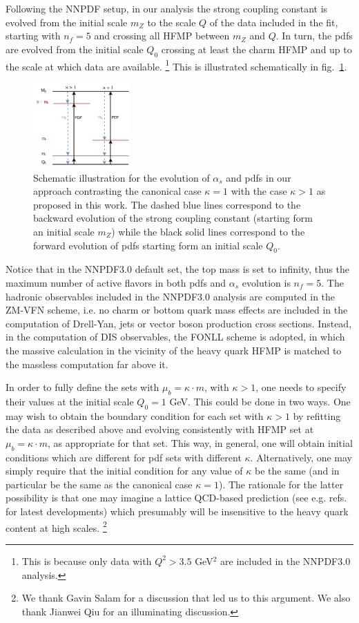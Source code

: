 \documentclass[letter,11pt]{article}
\def\as{\alpha_s}
\def\nf{{n_f}}
\def\mub{\mu_b}
\def\k{\kappa}
\begin{document}
Following the NNPDF setup, in our analysis the strong coupling constant is evolved from the initial scale $m_Z$ to the scale $Q$ of the data included in the fit, starting with $\nf=5$ and crossing all HFMP between $m_Z$ and $Q$. In turn, the pdfs are evolved from the initial scale $Q_0$ crossing at least the charm HFMP and up to the scale at which data are available.
%
\footnote{This is because only data with $Q^2>3.5$ GeV$^2$ are included in the NNPDF3.0 analysis.}
%
This is illustrated schematically in fig.~\ref{fig:diagram}.
%
\begin{figure}[t]
\centering
\includegraphics[width=0.33\textwidth]{./diagram2.pdf}
\caption{\label{fig:diagram} Schematic illustration for the evolution of $\as$ and pdfs in our approach contrasting the canonical case $\k=1$ with the case $\k>1$ as proposed in this work. The dashed blue lines correspond to the backward evolution of the strong coupling constant (starting form an initial scale $m_Z$) while the black solid lines correspond to the forward evolution of pdfs starting form an initial scale $Q_0$.}
\end{figure}
%


Notice that in the NNPDF3.0 default set, the top mass is set to infinity, thus the maximum number of active flavors in both pdfs and $\as$ evolution is $\nf=5$. The hadronic observables included in the NNPDF3.0 analysis are computed in the ZM-VFN scheme, i.e. no charm or bottom quark mass effects are included in the computation of Drell-Yan, jets or vector boson production cross sections. Instead, in the computation of DIS observables, the FONLL scheme is adopted, in which the massive calculation in the vicinity of the heavy quark HFMP is matched to the massless computation far above it. 

In order to fully define the sets with $\mub=\k \cdot m$, with $\k>1$, one needs to specify their values at the initial scale $Q_0=1$ GeV. This could be done in two ways. One may wish to obtain the boundary condition for each set with $\k>1$ by refitting the data as described above and evolving consistently with HFMP set at $\mub=\k\cdot m$, as appropriate for that set. This way, in general, one will obtain initial conditions which are different for pdf sets with different $\k$. Alternatively, one may simply require that the initial condition for any value of $\k$ be the same (and in particular be the same as the canonical case $\k=1$). The rationale for the latter possibility is that one may imagine a lattice QCD-based prediction (see e.g. refs.~\cite{Alexandrou:2017huk,Orginos:2017kos,Nocera:2017war} for latest developments) which presumably will be insensitive to the heavy quark content at high scales.
%
\footnote{We thank Gavin Salam for a discussion that led us to this argument. We also thank Jianwei Qiu for an illuminating discussion.}
%
\end{document}
